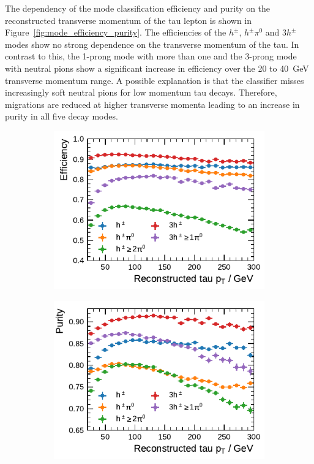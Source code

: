The dependency of the mode classification efficiency and purity on the
reconstructed transverse momentum of the tau lepton is shown in
Figure~\ref{fig:mode_efficiency_purity}. The efficiencies of the $h^\pm$,
$h^\pm \pi^0$ and $3h^\pm$ modes show no strong dependence on the transverse
momentum of the tau. In contrast to this, the 1-prong mode with more than one
and the 3-prong mode with neutral pions show a significant increase in
efficiency over the \num{20} to \SI{40}{\GeV} transverse momentum range. A
possible explanation is that the classifier misses increasingly soft neutral
pions for low momentum tau decays. Therefore, migrations are reduced at higher
transverse momenta leading to an increase in purity in all five decay modes.

\begin{figure}[htb]
  \begin{subfigure}{0.48\textwidth}
    \centering
    \includegraphics{./figures/decay_mode_classification/highpt/efficiency_profile_extended.pdf}
    \vspace*{-1.6em}
    \subcaption{}
  \end{subfigure}\hfill
  \begin{subfigure}{0.48\textwidth}
    \centering
    \includegraphics{./figures/decay_mode_classification/highpt/purity_profile_extended.pdf}

\end{subfigure}
\end{figure}
